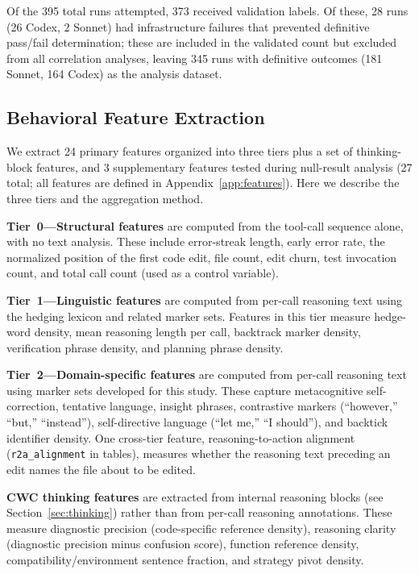 \documentclass[11pt]{article}
\newcommand{\feat}[1]{\texttt{#1}}
\newcommand{\rtalign}{\feat{r2a\_alignment}}
\begin{document}
Of the 395 total runs attempted, 373 received validation labels.
Of these, 28 runs (26 Codex, 2 Sonnet) had infrastructure failures that prevented definitive pass/fail determination; these are included in the validated count but excluded from all correlation analyses, leaving 345 runs with definitive outcomes (181 Sonnet, 164 Codex) as the analysis dataset.

\subsection{Behavioral Feature Extraction}

We extract 24 primary features organized into three tiers plus a set of thinking-block features, and 3 supplementary features tested during null-result analysis (27 total; all features are defined in Appendix~\ref{app:features}).
Here we describe the three tiers and the aggregation method.

\textbf{Tier~0---Structural features} are computed from the tool-call sequence alone, with no text analysis.
These include error-streak length, early error rate, the normalized position of the first code edit, file count, edit churn, test invocation count, and total call count (used as a control variable).

\textbf{Tier~1---Linguistic features} are computed from per-call reasoning text using the \citet{hyland2005metadiscourse} hedging lexicon and related marker sets.
Features in this tier measure hedge-word density, mean reasoning length per call, backtrack marker density, verification phrase density, and planning phrase density.

\textbf{Tier~2---Domain-specific features} are computed from per-call reasoning text using marker sets developed for this study.
These capture metacognitive self-correction, tentative language, insight phrases, contrastive markers (``however,'' ``but,'' ``instead''), self-directive language (``let me,'' ``I should''), and backtick identifier density.
One cross-tier feature, reasoning-to-action alignment (\rtalign{} in tables), measures whether the reasoning text preceding an edit names the file about to be edited.

\textbf{CWC thinking features} are extracted from internal reasoning blocks (see Section~\ref{sec:thinking}) rather than from per-call reasoning annotations.
These measure diagnostic precision (code-specific reference density), reasoning clarity (diagnostic precision minus confusion score), function reference density, compatibility/environment sentence fraction, and strategy pivot density.
\end{document}
